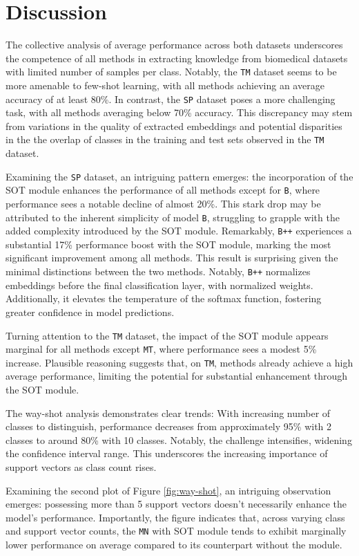 \section{Discussion}

The collective analysis of average performance across both datasets underscores the competence of all methods in extracting knowledge from biomedical datasets with limited number of samples per class. Notably, the \texttt{TM} dataset seems to be more amenable to few-shot learning, with all methods achieving an average accuracy of at least 80\%. In contrast, the \texttt{SP} dataset poses a more challenging task, with all methods averaging below 70\% accuracy. This discrepancy may stem from variations in the quality of extracted embeddings and potential disparities in the the overlap of classes in the training and test sets observed in the \texttt{TM} dataset.

Examining the \texttt{SP} dataset, an intriguing pattern emerges: the incorporation of the SOT module enhances the performance of all methods except for \texttt{B}, where performance sees a notable decline of almost 20\%. This stark drop may be attributed to the inherent simplicity of model \texttt{B}, struggling to grapple with the added complexity introduced by the SOT module.  Remarkably, \texttt{B++} experiences a substantial 17\% performance boost with the SOT module, marking the most significant improvement among all methods. This result is surprising given the minimal distinctions between the two methods. Notably, \texttt{B++} normalizes embeddings before the final classification layer, with normalized weights. 
Additionally, it elevates the temperature of the softmax function, fostering greater confidence in model predictions.

Turning attention to the \texttt{TM} dataset, the impact of the SOT module appears marginal for all methods except \texttt{MT}, 
where performance sees a modest 5\% increase. Plausible reasoning suggests that, on \texttt{TM}, 
methods already achieve a high average performance, limiting the potential for substantial enhancement through the SOT module.

The way-shot analysis demonstrates clear trends: With increasing number of classes to distinguish, performance decreases from approximately 95\% with 2 classes to around 80\% with 10 classes. Notably, the challenge intensifies, widening the confidence interval range. This underscores the increasing importance of support vectors as class count rises.

Examining the second plot of Figure \ref{fig:way-shot}, an intriguing observation emerges:  possessing more than 5 support vectors doesn't necessarily enhance the model's performance.  Importantly, the figure indicates that, across varying class and support vector counts, the \texttt{MN} with SOT module tends to exhibit marginally lower performance on average compared  to its counterpart without the module. 